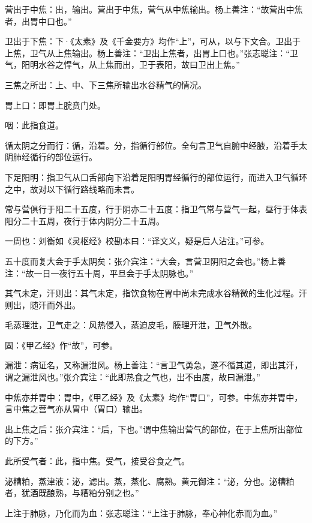 \documentclass[12pt]{ctexbook}
\begin{document}

\begin{jiaozhu}
  \item 营出于中焦：出，输出。营出于中焦，营气从中焦输出。杨上善注：“故营出中焦者，出胃中口也。”
  \item 卫出于下焦：下·《太素》及《千金要方》均作“上”，可从，以与下文合。卫出于上焦，卫气从上焦输出。杨上善注：“卫出上焦者，出胃上口也。”张志聪注：“卫气，阳明水谷之悍气，从上焦而出，卫于表阳，故曰卫出上焦。”
  \item 三焦之所出：上、中、下三焦所输出水谷精气的情况。
  \item 胃上口：即胃上脘贲门处。
  \item 咽：此指食道。
  \item 循太阴之分而行：循，沿着。分，指循行部位。全句言卫气自腑中经腋，沿着手太阴肺经循行的部位运行。
  \item 下足阳明：指卫气从口舌部向下沿着足阳明胃经循行的部位运行，而进入卫气循环之中，故对以下循行路线略而未言。
  \item 常与营俱行于阳二十五度，行于阴亦二十五度：指卫气常与营气一起，昼行于体表阳分二十五周，夜行于体内阴分二十五周。
  \item 一周也：刘衡如《灵枢经》校勘本曰：“译文义，疑是后人沾注。”可参。
  \item 五十度而复大会于手太阴矣：张介宾注：“大会，言营卫阴阳之会也。”杨上善注：“故一日一夜行五十周，平旦会于手太阴脉也。”
  \item 其气未定，汗则出：其气未定，指饮食物在胃中尚未完成水谷精微的生化过程。汗则出，随汗而外出。
  \item 毛蒸理泄，卫气走之：风热侵入，蒸迫皮毛，腠理开泄，卫气外散。
  \item 固：《甲乙经》作“故”，可参。
  \item 漏泄：病证名，又称漏泄风。杨上善注：“言卫气勇急，遂不循其道，即出其汗，谓之漏泄风也。”张介宾注：“此即热食之气也，出不由度，故曰漏泄。”
  \item 中焦亦并胃中：胃中，《甲乙经》及《太素》均作“胃口”，可参。中焦亦并胃中，言中焦之营气亦从胃中（胃口）输出。
  \item 出上焦之后：张介宾注：“后，下也。”谓中焦输出营气的部位，在于上焦所出部位的下方。”
  \item 此所受气者：此，指中焦。受气，接受谷食之气。
  \item 泌糟粕，蒸津液：泌，滤出。蒸，蒸化、腐熟。黄元御注：“泌，分也。泌糟粕者，犹酒既酿熟，与糟粕分别之也。”
  \item 上注于肺脉，乃化而为血：张志聪注：“上注于肺脉，奉心神化赤而为血。”

\end{jiaozhu}
\end{document}
